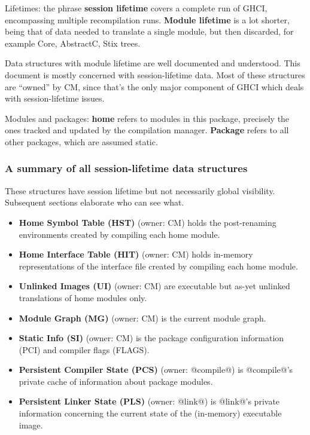 \documentclass[11pt]{article}
\begin{document}
Lifetimes: the phrase {\bf session lifetime} covers a complete run of
GHCI, encompassing multiple recompilation runs.  {\bf Module lifetime}
is a lot shorter, being that of data needed to translate a single
module, but then discarded, for example Core, AbstractC, Stix trees.

Data structures with module lifetime are well documented and understood.
This document is mostly concerned with session-lifetime data.
Most of these structures are ``owned'' by CM, since that's
the only major component of GHCI which deals with session-lifetime
issues. 

Modules and packages: {\bf home} refers to modules in this package,
precisely the ones tracked and updated by the compilation manager.
{\bf Package} refers to all other packages, which are assumed static.

\subsubsection*{A summary of all session-lifetime data structures}

These structures have session lifetime but not necessarily global
visibility.  Subsequent sections elaborate who can see what.
\begin{itemize}
\item {\bf Home Symbol Table (HST)} (owner: CM) holds the post-renaming
      environments created by compiling each home module.
\item {\bf Home Interface Table (HIT)} (owner: CM) holds in-memory
      representations of the interface file created by compiling 
      each home module.
\item {\bf Unlinked Images (UI)} (owner: CM) are executable but as-yet
      unlinked translations of home modules only.
\item {\bf Module Graph (MG)} (owner: CM) is the current module graph.
\item {\bf Static Info (SI)} (owner: CM) is the package configuration
      information (PCI) and compiler flags (FLAGS).
\item {\bf Persistent Compiler State (PCS)} (owner: @compile@)
      is @compile@'s private cache of information about package
      modules.
\item {\bf Persistent Linker State (PLS)} (owner: @link@) is
      @link@'s private information concerning the current 
      state of the (in-memory) executable image.
\end{itemize}
\end{document}
